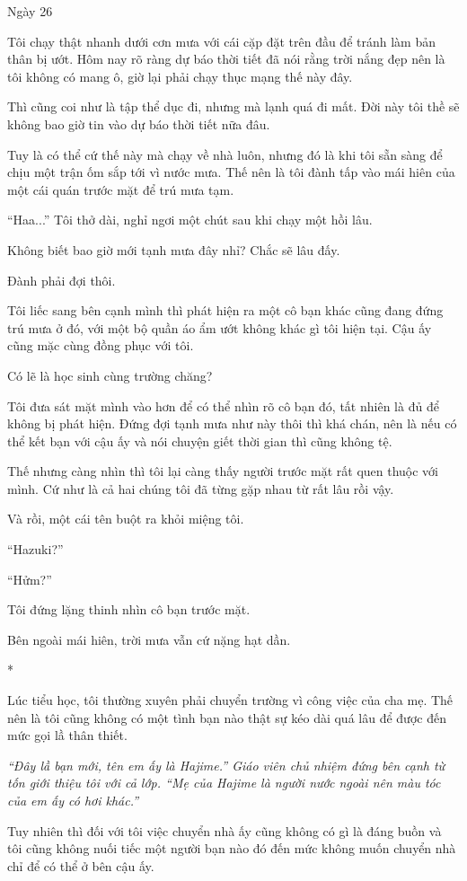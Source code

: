 {Ngày 26}
{
Tôi chạy thật nhanh dưới cơn mưa với cái cặp đặt trên đầu để tránh làm
bản thân bị ướt. Hôm nay rõ ràng dự báo thời tiết đã nói rằng trời nắng
đẹp nên là tôi không có mang ô, giờ lại phải chạy thục mạng thế này đây.

Thì cũng coi như là tập thể dục đi, nhưng mà lạnh quá đi mất. Đời này
tôi thề sẽ không bao giờ tin vào dự báo thời tiết nữa đâu.

Tuy là có thể cứ thế này mà chạy về nhà luôn, nhưng đó là khi tôi sẵn
sàng để chịu một trận ốm sắp tới vì nước mưa. Thế nên là tôi đành tấp
vào mái hiên của một cái quán trước mặt để trú mưa tạm.

``Haa...'' Tôi thở dài, nghỉ ngơi một chút sau khi chạy một hồi lâu.

Không biết bao giờ mới tạnh mưa đây nhỉ? Chắc sẽ lâu đấy.

Đành phải đợi thôi.

Tôi liếc sang bên cạnh mình thì phát hiện ra một cô bạn khác cũng đang
đứng trú mưa ở đó, với một bộ quần áo ẩm ướt không khác gì tôi hiện tại.
Cậu ấy cũng mặc cùng đồng phục với tôi.

Có lẽ là học sinh cùng trường chăng?

Tôi đưa sát mặt mình vào hơn để có thể nhìn rõ cô bạn đó, tất nhiên là
đủ để không bị phát hiện. Đứng đợi tạnh mưa như này thôi thì khá chán,
nên là nếu có thể kết bạn với cậu ấy và nói chuyện giết thời gian thì
cũng không tệ.

Thế nhưng càng nhìn thì tôi lại càng thấy người trước mặt rất quen thuộc
với mình. Cứ như là cả hai chúng tôi đã từng gặp nhau từ rất lâu rồi
vậy.

Và rồi, một cái tên buột ra khỏi miệng tôi.

``Hazuki?''

``Hửm?''

Tôi đứng lặng thinh nhìn cô bạn trước mặt.

Bên ngoài mái hiên, trời mưa vẫn cứ nặng hạt dần.

*

Lúc tiểu học, tôi thường xuyên phải chuyển trường vì công việc của cha
mẹ. Thế nên là tôi cũng không có một tình bạn nào thật sự kéo dài quá
lâu để được đến mức gọi lầ thân thiết.

\emph{``Đây lầ bạn mới, tên em ấy là Hajime.'' Giáo viên chủ nhiệm đứng
bên cạnh từ tốn giới thiệu tôi với cả lớp. ``Mẹ của Hajime là người nước
ngoài nên màu tóc của em ấy có hơi khác.''}

Tuy nhiên thì đối với tôi việc chuyển nhà ấy cũng không có gì là đáng
buồn và tôi cũng không nuối tiếc một người bạn nào đó đến mức không muốn
chuyển nhà chỉ để có thể ở bên cậu ấy.

}
